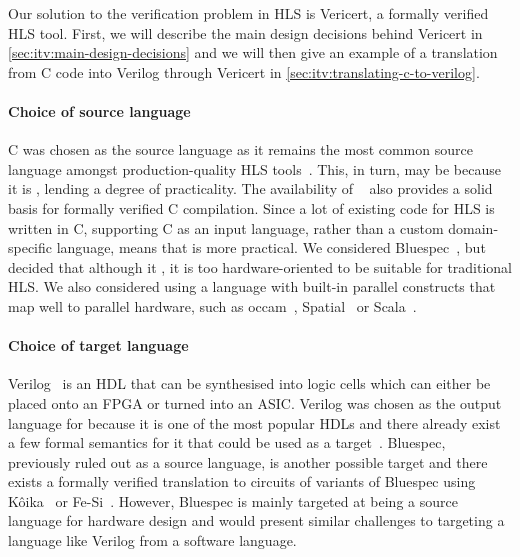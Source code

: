 Our solution to the verification problem in \gls{HLS} is Vericert, a formally
verified \gls{HLS} tool.  First, we will describe the main design decisions
behind Vericert in \cref{sec:itv:main-design-decisions} and we will then give an
example of a translation from C code into Verilog through Vericert in
\cref{sec:itv:translating-c-to-verilog}.

\paragraph{Choice of source language}

C was chosen as the source language as it remains the most common source
language amongst production-quality HLS tools~\cite{canis13_l,
  amd23_vitis_high_synth, intel20_hsc, pilato13_bambu}. This, in turn, may be
because it is , lending a
degree of practicality.  The availability of
\compcert{}~\cite{leroy09_formal_verif_realis_compil} also provides a solid
basis for formally verified C compilation.  Since a lot of existing code for HLS
is written in C, supporting C as an input language, rather than a custom
domain-specific language, means that \vericert{} is more practical.  We
considered Bluespec~\cite{nikhil04_bsv}, but decided that although it
, it is too hardware-oriented to be suitable for traditional HLS.  We
also considered using a language with built-in parallel constructs that map well
to parallel hardware, such as occam~\cite{page91_compil_occam},
Spatial~\cite{koeplinger18_s} or Scala~\cite{bachrach12_chisel}.

\paragraph{Choice of target language}

Verilog~\cite{06_ieee_stand_veril_hardw_descr_languag} is an \gls{HDL} that can
be synthesised into logic cells which can either be placed onto an \gls{FPGA} or
turned into an \gls{ASIC}.  Verilog was chosen as the output language for
\vericert{} because it is one of the most popular HDLs and there already exist a
few formal semantics for it that could be used as a
target~\cite{lööw19_verif_compil_verif_proces, meredith10_veril}.  Bluespec,
previously ruled out as a source language, is another possible target and there
exists a formally verified translation to circuits of variants of Bluespec using
K\^{o}ika~\cite{bourgeat20_essen_blues} or
Fe-Si~\cite{braibant13_formal_verif_hardw_synth}.  However, Bluespec is mainly
targeted at being a source language for hardware design and would present
similar challenges to targeting a language like Verilog from a software
language.

